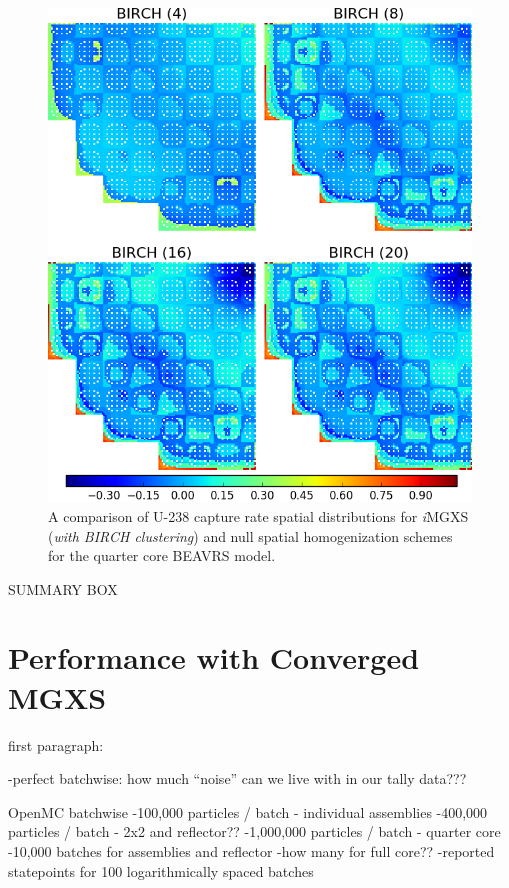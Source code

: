 \begin{figure}[h!]
\centering
\includegraphics[width=0.9\linewidth]{figures/results/compare/full-core/compare-capt-birch}
\vspace{2mm}
\caption[U-238 capture rate comparison for the quarter core BEAVRS model]{A comparison of U-238 capture rate spatial distributions for \textit{i}\ac{MGXS} (\textit{with BIRCH clustering}) and null spatial homogenization schemes for the quarter core BEAVRS model.}
\label{fig:chap11-assm-full-core-capt-rates-birch-comp}
\end{figure}

\clearpage

SUMMARY BOX


\section{Performance with Converged MGXS}
\label{sec:chap11-improvements}

first paragraph:

-perfect batchwise: how much ``noise'' can we live with in our tally data???

OpenMC batchwise
-100,000 particles / batch - individual assemblies
-400,000 particles / batch - 2x2 and reflector??
-1,000,000 particles / batch - quarter core
-10,000 batches for assemblies and reflector
-how many for full core??
-reported statepoints for 100 logarithmically spaced batches

